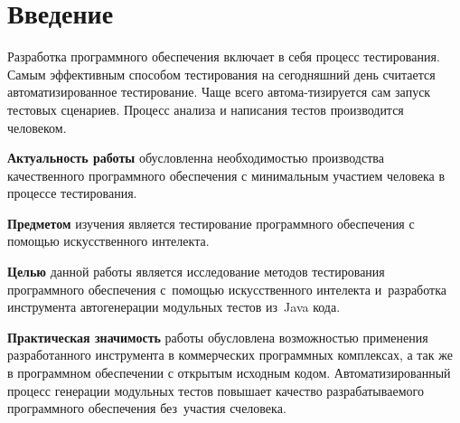 \chapter*{Введение}                         %


\hspace*{2.5em}Разработка программного обеспечения включает в себя процесс тестирования. Самым эффективным способом тестирования на сегодняшний день считается автоматизированное тестирование. Чаще всего автома-тизируется сам запуск тестовых сценариев. Процесс анализа и написания тестов производится человеком.

\textbf{Актуальность работы} обусловленна необходимостью производства качественного программного обеспечения с минимальным участием человека в процессе тестирования.

\textbf{Предметом} изучения является тестирование программного обеспечения с помощью искусственного интелекта. 

\textbf{Целью} данной работы является исследование методов тестирования программного обеспечения с~помощью искусственного интелекта и~разработка инструмента автогенерации модульных тестов из~Java кода.​

\textbf{Практическая значимость} работы обусловлена возможностью применения разработанного инструмента в коммерческих программных комплексах, а так же в программном обеспечении с открытым исходным кодом. Автоматизированный процесс генерации модульных тестов повышает качество разрабатываемого программного обеспечения без~участия счеловека.


%
